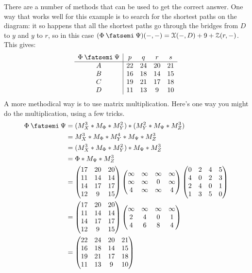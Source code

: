 \documentclass[7Sketches]{subfiles}
\begin{document}
{\[\]
}{
There are a number of methods that can be used to get the correct answer. One
way that works well for this example is to search for the shortest paths on the
diagram: it so happens that all the shortest paths go through the bridges from
$D$ to $y$ and $y$ to $r$, so in this case $(\Phi\cp\Psi)(-,-) =
\cat{X}(-,D)+9+\cat{Z}(r,-)$. This gives:
\[
\begin{array}{c|cccc}
  \Phi\cp\Psi&p&q&r&s\\\hline
  A&22&24&20&21\\
  B&16&18&14&15\\
  C&19&21&17&18\\
  D&11&13&9&10
\end{array}
\]
A more methodical way is to use matrix multiplication. Here's one way you might
do the multiplication, using a few tricks.
\begin{align*}
\Phi\cp\Psi &= (M_X^3 \ast M_\Phi \ast M_Y^2) \ast (M_Y^2 \ast M_\Psi \ast M_Z^3) \\
&= M_X^3 \ast M_\Phi \ast M_Y^4 \ast M_\Psi \ast M_Z^3 \\
&= (M_X^3 \ast M_\Phi \ast M_Y^2) \ast M_\Psi \ast M_Z^3 \\
&= \Phi \ast M_\Psi \ast M_Z^3 \\
&=
\begin{pmatrix}
  17&20&20\\
  11&14&14\\
  14&17&17\\
  12&9&15
\end{pmatrix}
\begin{pmatrix}
  \infty&\infty&\infty&\infty\\
  \infty&\infty&0&\infty\\
  4&\infty&\infty&4
\end{pmatrix}
\begin{pmatrix}
  0&2&4&5\\
  4&0&2&3\\
  2&4&0&1\\
  1&3&5&0
\end{pmatrix} \\
&=
\begin{pmatrix}
  17&20&20\\
  11&14&14\\
  14&17&17\\
  12&9&15
\end{pmatrix}
\begin{pmatrix}
  \infty&\infty&\infty&\infty\\
  2&4&0&1\\
  4&6&8&4
\end{pmatrix} \\
&=
\begin{pmatrix}
  22&24&20&21\\
  16&18&14&15\\
  19&21&17&18\\
  11&13&9&10
\end{pmatrix}
\end{align*}
}
\end{document}

